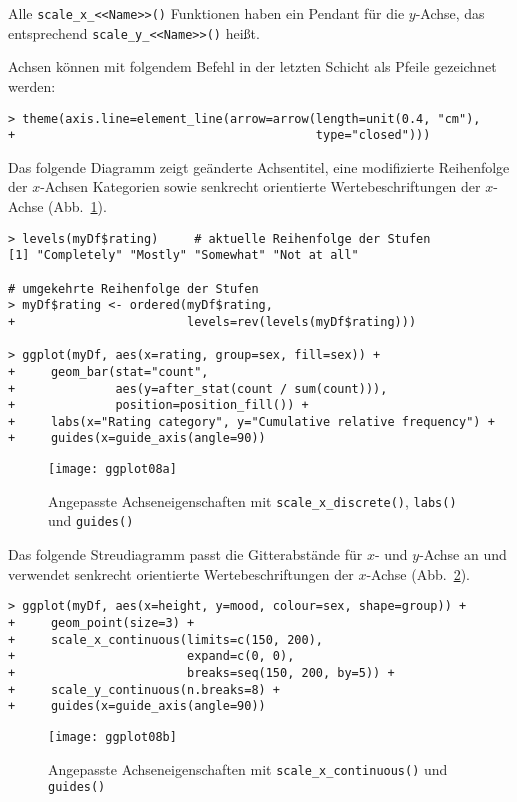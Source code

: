 Alle \lstinline!scale_x_<<Name>>()! Funktionen haben ein Pendant für die $y$-Achse, das entsprechend \lstinline!scale_y_<<Name>>()! heißt.

Achsen können mit folgendem Befehl in der letzten Schicht als Pfeile gezeichnet werden:
\begin{lstlisting}
> theme(axis.line=element_line(arrow=arrow(length=unit(0.4, "cm"),
+                                          type="closed")))
\end{lstlisting}

Das folgende Diagramm zeigt geänderte Achsentitel, eine modifizierte Reihenfolge der $x$-Achsen Kategorien sowie senkrecht orientierte Wertebeschriftungen der $x$-Achse (Abb.\ \ref{fig:ggplot08a}).
\begin{lstlisting}
> levels(myDf$rating)     # aktuelle Reihenfolge der Stufen
[1] "Completely" "Mostly" "Somewhat" "Not at all"

# umgekehrte Reihenfolge der Stufen
> myDf$rating <- ordered(myDf$rating,
+                        levels=rev(levels(myDf$rating)))

> ggplot(myDf, aes(x=rating, group=sex, fill=sex)) +
+     geom_bar(stat="count",
+              aes(y=after_stat(count / sum(count))),
+              position=position_fill()) +
+     labs(x="Rating category", y="Cumulative relative frequency") +
+     guides(x=guide_axis(angle=90))
\end{lstlisting}

\begin{figure}[ht]
\centering
\texttt{[image: ggplot08a]}
\vspace*{-0.5em}
\caption{Angepasste Achseneigenschaften mit \lstinline!scale_x_discrete()!, \lstinline!labs()! und \lstinline!guides()!}
\label{fig:ggplot08a}
\end{figure}

Das folgende Streudiagramm passt die Gitterabstände für $x$- und $y$-Achse an und verwendet senkrecht orientierte Wertebeschriftungen der $x$-Achse  (Abb.\ \ref{fig:ggplot08bc}).
\begin{lstlisting}
> ggplot(myDf, aes(x=height, y=mood, colour=sex, shape=group)) +
+     geom_point(size=3) +
+     scale_x_continuous(limits=c(150, 200),
+                        expand=c(0, 0),
+                        breaks=seq(150, 200, by=5)) +
+     scale_y_continuous(n.breaks=8) +
+     guides(x=guide_axis(angle=90))
\end{lstlisting}

\begin{figure}[ht]
\centering
\texttt{[image: ggplot08b]}
\vspace*{-0.5em}
\caption{Angepasste Achseneigenschaften mit \lstinline!scale_x_continuous()! und \lstinline!guides()!}
\label{fig:ggplot08bc}
\end{figure}

